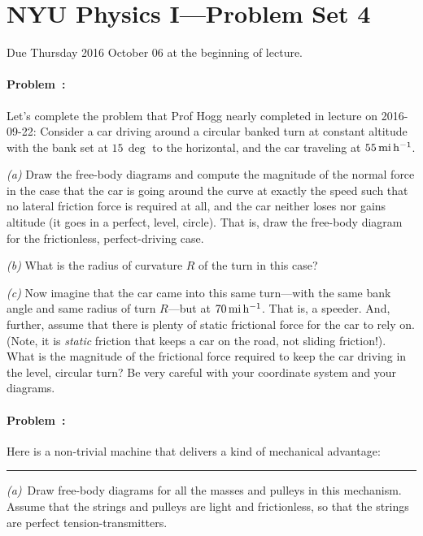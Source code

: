 \documentclass[12pt]{article}
\begin{document}
\section*{NYU Physics I---Problem Set 4}

Due Thursday 2016 October 06 at the beginning of lecture.

\paragraph{Problem~\theproblem:}%
Let's complete the problem that Prof Hogg nearly completed in lecture
on 2016-09-22: Consider a car driving around a circular banked turn at
constant altitude with the bank set at $15\,\deg$ to the horizontal,
and the car traveling at $55\,\mathrm{mi}\,\mathrm{h}^{-1}$.

\textsl{(a)} Draw the free-body diagrams and compute the magnitude of
the normal force in the case that the car is going around the curve at
exactly the speed such that no lateral friction force is required at
all, and the car neither loses nor gains altitude (it goes in a
perfect, level, circle). That is, draw the free-body diagram for the
frictionless, perfect-driving case.

\textsl{(b)} What is the radius of curvature $R$ of the turn in this
case?

\textsl{(c)} Now imagine that the car came into this same turn---with
the same bank angle and same radius of turn $R$---but at
$70\,\mathrm{mi}\,\mathrm{h}^{-1}$. That is, a speeder. And, further, assume that there is
plenty of static frictional force for the car to rely on. (Note, it is
\emph{static} friction that keeps a car on the road, not sliding
friction!). What is the magnitude of the frictional force required to
keep the car driving in the level, circular turn? Be very careful with
your coordinate system and your diagrams.

\paragraph{Problem~\theproblem:}%
Here is a non-trivial machine that delivers a kind of mechanical
advantage:
\\ \rule{0.33\textwidth}{0pt}

\textsl{(a)}~Draw free-body diagrams for all the masses and pulleys in
this mechanism. Assume that the strings and pulleys are light and
frictionless, so that the strings are perfect tension-transmitters.
\end{document}
